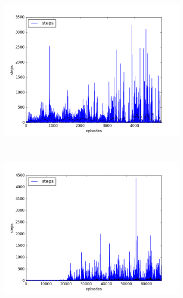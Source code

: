 \begin{figure}[t]
  \vspace*{-2.25cm}
  \begin{subfigure}[t]{\figscale\linewidth}
    \hspace*{-2.75cm}
    \includegraphics[width=1.5\textwidth]
    {../results/dqn_1vs1/steps.png}
    \label{fig:dqn-1vs1-steps}
  \end{subfigure}
  ~
  \begin{subfigure}[t]{\figscale\linewidth}
    \hspace*{-1.4cm}
    \includegraphics[width=1.5\textwidth]
    {../results/ddpg_1vs1/steps.png}
    \label{fig:ddpg-1vs1-steps}
  \end{subfigure}

\end{figure}
